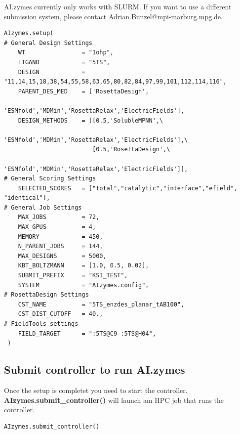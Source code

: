 \documentclass[10pt]{extarticle}
\begin{document}
\begin{tcolorbox}[colback=mpgAccentOrange!20!white,colframe=mpgAccentOrange!80!black,title=Warning]
AI.zymes currently only works with SLURM.
If you want to use a different submission system, please contact Adrian.Bunzel@mpi-marburg.mpg.de.
\end{tcolorbox}

\vspace*{0.5\baselineskip}
\begin{lstlisting}[basicstyle=\color{black}\fontsize{9}{11}\selectfont\ttfamily, frame=single, rulecolor=\color{black}, breaklines=true]
AIzymes.setup(
# General Design Settings
    WT                = "1ohp",
    LIGAND            = "5TS",
    DESIGN            = "11,14,15,18,38,54,55,58,63,65,80,82,84,97,99,101,112,114,116",
    PARENT_DES_MED    = ['RosettaDesign',
                         'ESMfold','MDMin','RosettaRelax','ElectricFields'],
    DESIGN_METHODS    = [[0.5,'SolubleMPNN',\
                              'ESMfold','MDMin','RosettaRelax','ElectricFields'],\
                         [0.5,'RosettaDesign',\
                              'ESMfold','MDMin','RosettaRelax','ElectricFields']],
# General Scoring Settings    
    SELECTED_SCORES   = ["total","catalytic","interface","efield", "identical"],    
# General Job Settings
    MAX_JOBS          = 72,
    MAX_GPUS          = 4,
    MEMORY            = 450,
    N_PARENT_JOBS     = 144,
    MAX_DESIGNS       = 5000,
    KBT_BOLTZMANN     = [1.0, 0.5, 0.02],   
    SUBMIT_PREFIX     = "KSI_TEST", 
    SYSTEM            = "AIzymes.config",
# RosettaDesign Settings
    CST_NAME          = "5TS_enzdes_planar_tAB100", 
    CST_DIST_CUTOFF   = 40.,
# FieldTools settings
    FIELD_TARGET      = ":5TS@C9 :5TS@H04",
 )                     
\end{lstlisting}
\vspace*{0.5\baselineskip}

\subsection{Submit controller to run AI.zymes}

Once the setup is completet you need to start the controller.
\textbf{AIzymes.submit\_controller()} will launch am HPC job that runs the controller.

\vspace*{0.5\baselineskip}
\begin{lstlisting}[basicstyle=\color{black}\fontsize{9}{11}\selectfont\ttfamily, frame=single, rulecolor=\color{black}, breaklines=true]
AIzymes.submit_controller()
\end{lstlisting}
\vspace*{0.5\baselineskip}
\end{document}
